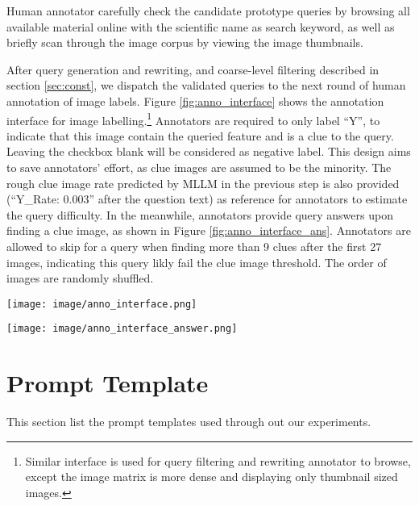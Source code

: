 Human annotator carefully check the candidate prototype queries by browsing all available material online with the scientific name as search keyword, as well as briefly scan through the image corpus by viewing the image thumbnails.

After query generation and rewriting, and coarse-level filtering described in section \ref{sec:const}, we dispatch the validated queries to the next round of human annotation of image labels.
Figure \ref{fig:anno_interface} shows the annotation interface for image labelling.\footnote{Similar interface is used for query filtering and rewriting annotator to browse, except the image matrix is more dense and displaying only thumbnail sized images.} Annotators are required to only label ``Y'', to indicate that this image contain the queried feature and is a clue to the query. Leaving the checkbox blank will be considered as negative label. This design aims to save annotators' effort, as clue images are assumed to be the minority. The rough clue image rate predicted by MLLM in the previous step is also provided (``Y\_Rate: 0.003'' after the question text) as reference for annotators to estimate the query difficulty. In the meanwhile, annotators provide query answers upon finding a clue image, as shown in Figure \ref{fig:anno_interface_ans}. Annotators are allowed to skip for a query when finding more than 9 clues after the first 27 images, indicating this query likly fail the clue image threshold. The order of images are randomly shuffled.


\begin{figure*}
    \centering
    \texttt{[image: image/anno\_interface.png]}
    \caption{Annotation interface for image labelling}
    \label{fig:anno_interface}
\end{figure*}

\begin{figure*}
    \centering
    \texttt{[image: image/anno\_interface\_answer.png]}
    \caption{Annotation interface for image label and query answer}
    \label{fig:anno_interface_ans}
\end{figure*}


\section{Prompt Template}
\label{sec:app_prompt}

This section list the prompt templates used through out our experiments.

